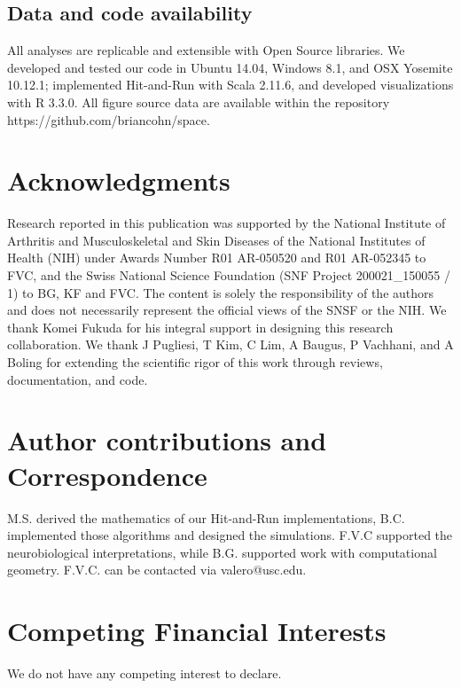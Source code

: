 \documentclass[letterpaper]{article}
\begin{document}
\subsection*{Data and code availability}
All analyses are replicable and extensible with Open Source libraries. We developed and tested our code in Ubuntu 14.04, Windows 8.1, and OSX Yosemite 10.12.1; implemented Hit-and-Run with Scala 2.11.6, and developed visualizations with R 3.3.0.
All figure source data are available within the repository https://github.com/briancohn/space.

\section*{Acknowledgments}
Research reported in this publication was supported by the National Institute of Arthritis and Musculoskeletal and Skin Diseases of the National Institutes of Health (NIH) under Awards Number R01 AR-050520 and R01 AR-052345 to FVC, and the Swiss National Science Foundation (SNF Project 200021\_150055 / 1) to BG, KF and FVC. The content is solely the responsibility of the authors and does not necessarily represent the official views of the SNSF or the NIH. We thank Komei Fukuda for his integral support in designing this research collaboration. We thank J Pugliesi, T Kim, C Lim, A Baugus, P Vachhani, and A Boling for extending the scientific rigor of this work through reviews, documentation, and code.

\section*{Author contributions and Correspondence}
M.S. derived the mathematics of our Hit-and-Run implementations, B.C. implemented those algorithms and designed the simulations. F.V.C supported the neurobiological interpretations, while B.G. supported work with computational geometry. F.V.C. can be contacted via valero@usc.edu.

\section*{Competing Financial Interests}
We do not have any competing interest to declare.



% 
\end{document}
